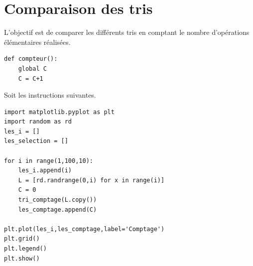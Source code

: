 \documentclass[
	fontsize=10pt, %
	twoside=true, %
]{kaobook}
\newcommand{\repRel}{../../../..}
\newcommand{\repStyle}{\repRel/Style}
\begin{document}
\iflivret {} \else
\ifprof  {} \else \fi
\fi



\renewcommand{\repExo}{\repRel/Informatique/Exercices/S1_08_Tris/}
\renewcommand{\nomExo}{04_TriComptage}
\graphicspath{{\repStyle/png}{\repExo\nomExo/images}}


\renewcommand{\repExo}{\repRel/Informatique/Exercices/S1_08_Tris/}
\renewcommand{\nomExo}{02_TriFusion}
\graphicspath{{\repStyle/png}{\repExo\nomExo/images}}



\section*{Comparaison des tris}

\begin{obj}
L'objectif est de comparer les différents tris en comptant le nombre d'opérations élémentaires réalisées.
\end{obj}




\begin{lstlisting}
def compteur():
    global C
    C = C+1	
\end{lstlisting}


Soit les instructions suivantes.
\begin{lstlisting}
import matplotlib.pyplot as plt
import random as rd
les_i = []
les_selection = []

for i in range(1,100,10):
    les_i.append(i)
    L = [rd.randrange(0,i) for x in range(i)]
    C = 0
    tri_comptage(L.copy())
    les_comptage.append(C)

plt.plot(les_i,les_comptage,label='Comptage')
plt.grid()
plt.legend()
plt.show()
\end{lstlisting}

\end{document}
